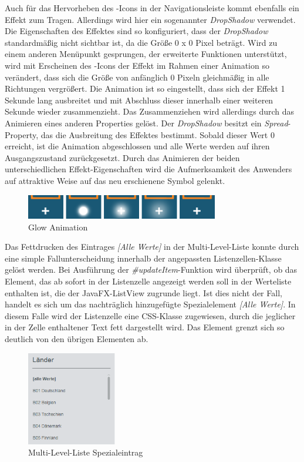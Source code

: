 Auch für das Hervorheben des -Icons in der Navigationsleiste kommt ebenfalls ein Effekt zum Tragen. Allerdings wird hier ein sogenannter \textit{DropShadow} verwendet. Die Eigenschaften des Effektes sind so konfiguriert, dass der \textit{DropShadow} standardmäßig nicht sichtbar ist, da die Größe 0 x 0 Pixel beträgt. Wird zu einem anderen Menüpunkt gesprungen, der erweiterte Funktionen unterstützt, wird mit Erscheinen des -Icons der Effekt im Rahmen einer Animation so verändert, dass sich die Größe von anfänglich 0 Pixeln gleichmäßig in alle Richtungen vergrößert. Die Animation ist so eingestellt, dass sich der Effekt 1 Sekunde lang ausbreitet und mit Abschluss dieser innerhalb einer weiteren Sekunde wieder zusammenzieht. Das Zusammenziehen wird allerdings durch das Animieren eines anderen Properties gelöst. Der \textit{DropShadow} besitzt ein \textit{Spread}- Property, das die Ausbreitung des Effektes bestimmt. Sobald dieser Wert 0 erreicht, ist die Animation abgeschlossen und alle Werte werden auf ihren Ausgangszustand zurückgesetzt. Durch das Animieren der beiden unterschiedlichen Effekt-Eigenschaften wird die Aufmerksamkeit des Anwenders auf attraktive Weise auf das neu erschienene Symbol gelenkt.\par
\begin{figure}[H]
 \centering
 \includegraphics[width=0.75\textwidth]{grafiken/glow_animation.png}
 \caption{Glow Animation}
 \label{fig:glowAnimation}
\end{figure}
Das Fettdrucken des Eintrages \textit{[Alle Werte]} in der Multi-Level-Liste konnte durch eine simple Fallunterscheidung innerhalb der angepassten Listenzellen-Klasse gelöst werden. Bei Ausführung der \textit{\#{}updateItem}-Funktion wird überprüft, ob das Element, das ab sofort in der Listenzelle angezeigt werden soll in der Werteliste enthalten ist, die der JavaFX-ListView zugrunde liegt. Ist dies nicht der Fall, handelt es sich um das nachträglich hinzugefügte Spezialelement \textit{[Alle Werte]}. In diesem Falle wird der Listenzelle eine CSS-Klasse zugewiesen, durch die jeglicher in der Zelle enthaltener Text fett dargestellt wird. Das Element grenzt sich so deutlich von den übrigen Elementen ab.\par
\begin{figure}[H]
 \centering
 \includegraphics[width=0.35\textwidth]{grafiken/mll_Werte.png}
 \caption{Multi-Level-Liste Spezialeintrag}
 \label{fig:mllSpecialValue}
\end{figure}
